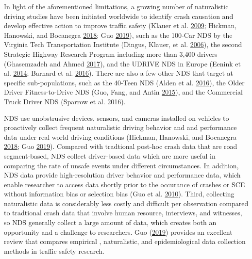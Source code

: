 \documentclass[12pt]{book}
\numberwithin{equation}{chapter}
\begin{document}
In light of the aforementioned limitations, a growing number of naturalistic driving studies have been initiated worldwide to identify crash causation and develop effective action to improve traffic safety (Klauer et al. \protect\hyperlink{ref-klauer2009comparing}{2009}; Hickman, Hanowski, and Bocanegra \protect\hyperlink{ref-hickman2018synthetic}{2018}; Guo \protect\hyperlink{ref-guo2019statistical}{2019}), such as the 100-Car NDS by the Virginia Tech Transportation Institute (Dingus, Klauer, et al. \protect\hyperlink{ref-dingus2006100}{2006}), the second Strategic Highway Research Program including more than 3,400 drivers (Ghasemzadeh and Ahmed \protect\hyperlink{ref-ghasemzadeh2017probit}{2017}), and the UDRIVE NDS in Europe (Eenink et al. \protect\hyperlink{ref-eenink2014udrive}{2014}; Barnard et al. \protect\hyperlink{ref-barnard2016study}{2016}). There are also a few other NDS that target at specific sub-populations, such as the 40-Teen NDS (Alden et al. \protect\hyperlink{ref-alden2016animal}{2016}), the Older Driver Fitness-to-Drive NDS (Guo, Fang, and Antin \protect\hyperlink{ref-guo2015older}{2015}), and the Commercial Truck Driver NDS (Sparrow et al. \protect\hyperlink{ref-sparrow2016naturalistic}{2016}).

NDS use unobstrusive devices, sensors, and cameras installed on vehicles to proactively collect frequent naturalistic driving behavior and and performance data under real-world driving conditions (Hickman, Hanowski, and Bocanegra \protect\hyperlink{ref-hickman2018synthetic}{2018}; Guo \protect\hyperlink{ref-guo2019statistical}{2019}). Compared with tradtional post-hoc crash data that are road segment-based, NDS collect driver-based data which are more useful in comparing the rate of unsafe events under different circumstances. In addition, NDS data provide high-resolution driver behavior and performance data, which enable researcher to access data shortly prior to the occurance of crashes or SCE without information bias or selection bias (Guo et al. \protect\hyperlink{ref-guo2010near}{2010}). Third, collecting naturalistic data is considerably less costly and difficult per observation compared to tradtional crash data that involve human resource, interviews, and witnesses, so NDS generally collect a large amount of data, which creates both an opportunity and a challenge to researchers. Guo (\protect\hyperlink{ref-guo2019statistical}{2019}) provides an excellent review that compares empirical , naturalistic, and epidemiological data collection methods in traffic safety research.
\end{document}
